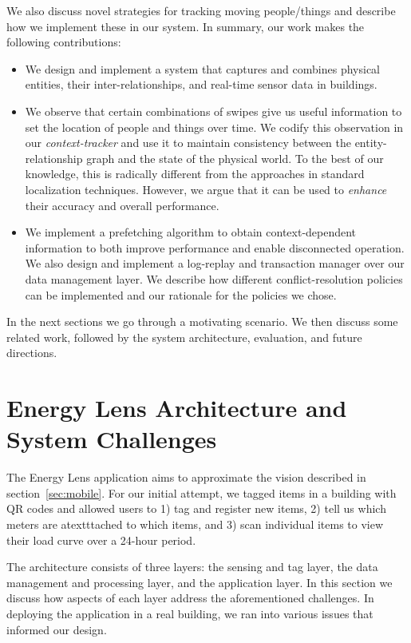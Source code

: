 We also discuss novel strategies for tracking moving people/things and describe how we implement these in our system.  In summary, our work
makes the following contributions:

\begin{itemize}
\item We design and implement a system that captures and combines physical entities, their inter-relationships, and real-time sensor data 
		in buildings.%
\item We observe that certain combinations of swipes give us useful information to set the location of people and things over time.
		We codify this observation in our \emph{context-tracker} and use it to maintain consistency between the entity-relationship graph and the 
		state of the physical world.  To the best of our knowledge, this is radically different from the approaches in standard 
		localization techniques.  However, we argue that it can be used to \emph{enhance} their accuracy and overall performance.
\item We implement a prefetching algorithm to obtain context-dependent information to both improve performance and
		enable disconnected operation.  We also design and implement a log-replay and transaction manager over our data management layer.  We describe how different conflict-resolution policies can be implemented and our rationale for the policies we chose.
\end{itemize}

\vspace{0.08in}

In the next sections we go through a motivating scenario.  We then discuss some related work, followed 
by the system architecture, evaluation, and future directions.


\section{Energy Lens Architecture and System Challenges}
The Energy Lens application aims to approximate the vision described in section~\ref{sec:mobile}.  For our initial
attempt, we tagged items in a building with QR codes and allowed users to 1) tag and register new items, 
2) tell us which meters are atextttached to which items, and 3) scan individual items to view their load curve over a 
24-hour period.

The architecture consists of three layers: the sensing and tag layer, the data management and processing layer, and the application
layer.  In this section we discuss how aspects of each layer address the aforementioned challenges.
In deploying the application in a real building, 
we ran into various issues that informed our design.  

